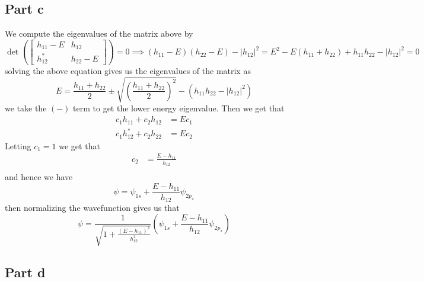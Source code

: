 \documentclass[12pt]{report}
\begin{document}
\subsection*{Part c}
We compute the eigenvalues of the matrix above by
\begin{equation*}
  \det\left(\begin{bmatrix} 
    h_{11} -E & h_{12} \\
    h_{12}^* & h_{22} - E
\end{bmatrix}\right) = 0 \implies (h_{11} - E)(h_{22} - E) - |h_{12}|^2 = E^2 - E(h_{11} + h_{22}) + h_{11}h_{22} - |h_{12}|^2 = 0
\end{equation*}
solving the above equation gives us the eigenvalues of the matrix as
\begin{equation*}
  E = \frac{h_{11} + h_{22}}{2} \pm \sqrt{\left(\frac{h_{11} + h_{22}}{2}\right)^2} - (h_{11}h_{22} - |h_{12}|^2)
\end{equation*}
we take the $(-)$ term to get the lower energy eigenvalue. Then we get that
\begin{align*}
  c_1 h_11 + c_2 h_{12} &= E c_1 \\ 
  c_1 h^*_{12} + c_2 h_{22} &= E c_2
\end{align*}
Letting $c_1 = 1$ we get that
\begin{align*}
  c_2 &= \frac{E-h_{11}}{h_{12}} \\
\end{align*}
and hence we have 
\begin{equation*}
  \psi = \psi_{1s} + \frac{E - h_{11}}{h_{12}}\psi_{2p_x}
\end{equation*}
then normalizing the wavefunction gives us that
\begin{equation*}
  \psi = \frac{1}{\sqrt{1 + \frac{(E - h_{11})^2}{h_{12}^2}}}\left(\psi_{1s} + \frac{E - h_{11}}{h_{12}}\psi_{2p_x}\right)
\end{equation*}

\subsection*{Part d}
\end{document}
